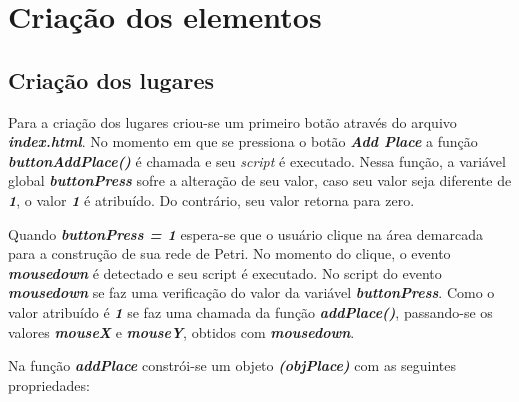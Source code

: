 \documentclass[
	12pt,				%
	openright,			%
	oneside,			%
	a4paper,			%
	english,			%
	brazil				%
	]{abntex2}
\begin{document}
\section{Criação dos elementos}

\subsection*{Criação dos lugares}

Para a criação dos lugares criou-se um primeiro botão através do arquivo \textit{\textbf{index.html}}. No momento em que se pressiona o botão \textit{\textbf{Add Place}} a função \textit{\textbf{buttonAddPlace()}} é chamada e seu \textit{script} é executado. Nessa função, a variável global \textit{\textbf{buttonPress}} sofre a alteração de seu valor, caso seu valor seja diferente de \textit{\textbf{1}}, o valor \textit{\textbf{1}} é atribuído. Do contrário, seu valor retorna para zero.



Quando \textit{\textbf{buttonPress = 1}} espera-se que o usuário clique na área demarcada para a construção de sua rede de Petri. No momento do clique, o evento \textit{\textbf{mousedown}} é detectado e seu script é executado. No script do evento \textit{\textbf{mousedown}} se faz uma verificação do valor da variável \textit{\textbf{buttonPress}}. Como o valor atribuído é \textit{\textbf{1}} se faz uma chamada da função \textit{\textbf{addPlace()}}, passando-se os valores \textbf{\textit{mouseX}} e \textbf{\textit{mouseY}}, obtidos com \textbf{\textit{mousedown}}. 



Na função \textbf{\textit{addPlace}} constrói-se um objeto \textbf{\textit{(objPlace)}} com as seguintes propriedades: 
\end{document}

